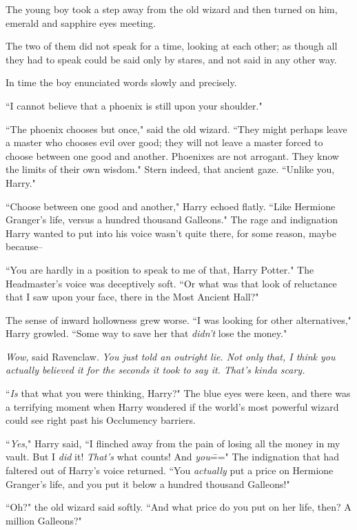 The young boy took a step away from the old wizard and then turned on him, emerald and sapphire eyes meeting.

The two of them did not speak for a time, looking at each other; as though all they had to speak could be said only by stares, and not said in any other way.

In time the boy enunciated words slowly and precisely.

``I cannot believe that a phoenix is still upon your shoulder."

``The phoenix chooses but once," said the old wizard. ``They might perhaps leave a master who chooses evil over good; they will not leave a master forced to choose between one good and another. Phoenixes are not arrogant. They know the limits of their own wisdom." Stern indeed, that ancient gaze. ``Unlike you, Harry."

``Choose between one good and another," Harry echoed flatly. ``Like Hermione Granger's life, versus a hundred thousand Galleons." The rage and indignation Harry wanted to put into his voice wasn't quite there, for some reason, maybe because\---

``You are hardly in a position to speak to me of that, Harry Potter." The Headmaster's voice was deceptively soft. ``Or what was that look of reluctance that I saw upon your face, there in the Most Ancient Hall?"

The sense of inward hollowness grew worse. ``I was looking for other alternatives," Harry growled. ``Some way to save her that \emph{didn't} lose the money."

\emph{Wow,} said Ravenclaw. \emph{You just told an outright lie. Not only that, I think you actually \emph{believed} it for the seconds it took to say it. That's kinda scary.}

``\emph{Is} that what you were thinking, Harry?" The blue eyes were keen, and there was a terrifying moment when Harry wondered if the world's most powerful wizard could see right past his Occlumency barriers.

``\emph{Yes}," Harry said, ``I flinched away from the pain of losing all the money in my vault. But I \emph{did} it! \emph{That's} what counts! And \emph{you}\===" The indignation that had faltered out of Harry's voice returned. ``You \emph{actually} put a price on Hermione Granger's life, and you put it below a hundred thousand Galleons!"

``Oh?" the old wizard said softly. ``And what price do you put on her life, then? A million Galleons?"

